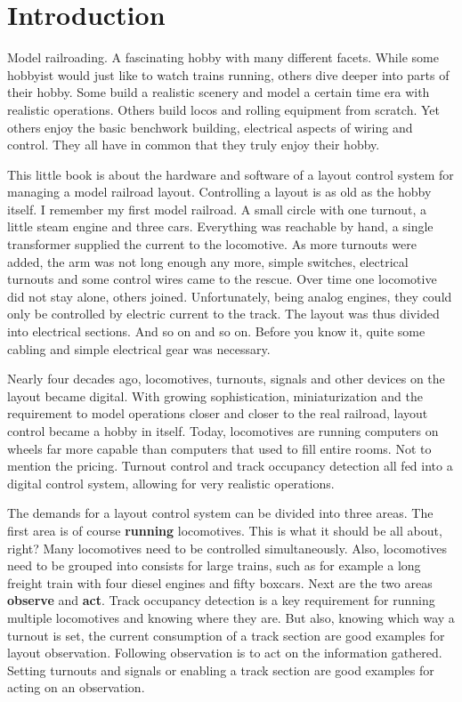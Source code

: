 \chapter{Introduction}

Model railroading. A fascinating hobby with many different facets. While some hobbyist would just like to watch trains running, others dive deeper into parts of their hobby. Some build a realistic scenery and model a certain time era with realistic operations. Others build locos and rolling equipment from scratch. Yet others enjoy the basic benchwork building, electrical aspects of wiring and control. They all have in common that they truly enjoy their hobby.

This little book is about the hardware and software of a layout control system for managing a model railroad layout. Controlling a layout is as old as the hobby itself. I remember my first model railroad. A small circle with one turnout, a little steam engine and three cars. Everything was reachable by hand, a single transformer supplied the current to the locomotive. As more turnouts were added, the arm was not long enough any more, simple switches, electrical turnouts and some control wires came to the rescue. Over time one locomotive did not stay alone, others joined. Unfortunately, being analog engines, they could only be controlled by electric current to the track. The layout was thus divided into electrical sections. And so on and so on. Before you know it, quite some cabling and simple electrical gear was necessary.

Nearly four decades ago, locomotives, turnouts, signals and other devices on the layout became digital. With growing sophistication, miniaturization and the requirement to model operations closer and closer to the real railroad, layout control became a hobby in itself. Today, locomotives are running computers on wheels far more capable than computers that used to fill entire rooms. Not to mention the pricing. Turnout control and track occupancy detection all fed into a digital control system, allowing for very realistic operations.

The demands for a layout control system can be divided into three areas. The first area is of course {\bf running} locomotives. This is what it should be all about, right? Many locomotives need to be controlled simultaneously. Also, locomotives need to be grouped into consists for large trains, such as for example a long freight train with four diesel engines and fifty boxcars. Next are the two areas {\bf observe} and {\bf act}. Track occupancy detection is a key requirement for running multiple locomotives and knowing where they are. But also, knowing which way a turnout is set, the current consumption of a track section are good examples for layout observation. Following observation is to act on the information gathered. Setting turnouts and signals or enabling a track section are good examples for acting on an observation.

